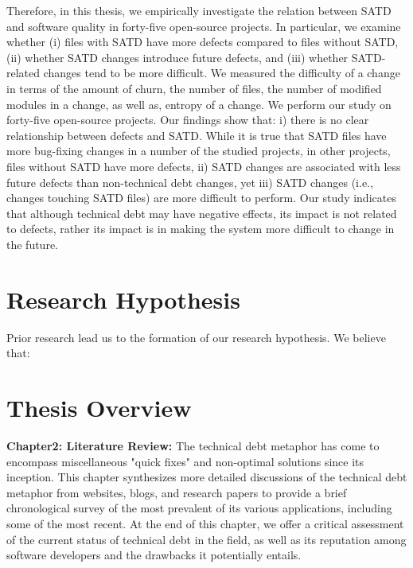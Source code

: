 Therefore, in this thesis, we empirically investigate the relation between SATD and software quality in forty-five open-source projects. In particular, we examine whether (i) files with SATD have more defects compared to files without SATD, (ii) whether SATD changes introduce future defects, and (iii) whether SATD-related changes tend to be more difficult. We measured the difficulty of a change in terms of the amount of churn, the number of files, the number of modified modules in a change, as well as, entropy of a change. We perform our study on forty-five open-source projects. Our findings show that: i) there is no clear relationship between defects and SATD. While it is true that SATD files have more bug-fixing changes in a number of the studied projects, in other projects, files without SATD have more defects, ii) SATD changes are associated with less future defects than non-technical debt changes, yet iii) SATD changes (i.e., changes touching SATD files) are more difficult to perform. Our study indicates that although technical debt may have negative effects, its impact is not related to defects, rather its impact is in making the system more difficult to change in the future.






\section{Research Hypothesis}
Prior research lead us to the formation of our research hypothesis. We believe that:


\section{Thesis Overview}

\textbf{Chapter2: Literature Review:} The technical debt metaphor has come to encompass miscellaneous "quick fixes" and non-optimal solutions since its inception.  This chapter synthesizes more detailed discussions of the technical debt metaphor from websites, blogs, and research papers to provide a brief chronological survey of the most prevalent of its various applications, including some of the most recent.  At the end of this chapter, we offer a critical assessment of the current status of technical debt in the field, as well as its reputation among software developers and the drawbacks it potentially entails.

